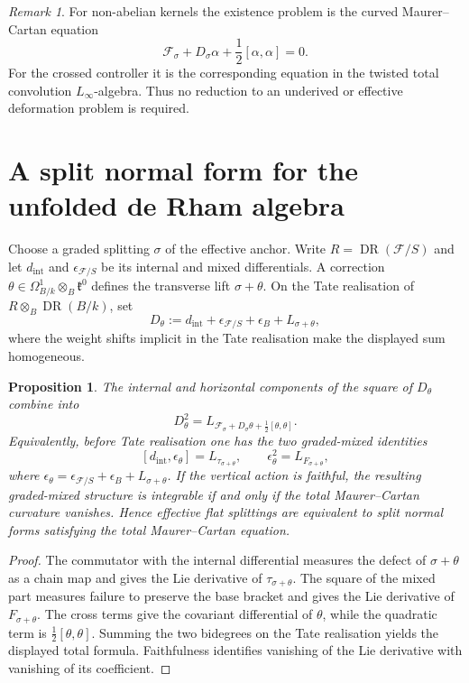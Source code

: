 \documentclass[11pt,reqno,a4paper,dvipsnames,x11names]{amsart}
\numberwithin{equation}{section}
\theoremstyle{plain}
\newtheorem{proposition}[theorem]{Proposition}
\theoremstyle{definition}
\theoremstyle{remark}
\newtheorem{remark}[theorem]{Remark}
\DeclareMathOperator{\DR}{DR}
\newcommand{\kk}{k}
\newcommand{\cF}{\mathcal F}
\newcommand{\kfr}{\mathfrak k}
\begin{document}
\begin{remark}
For non-abelian kernels the existence problem is the curved Maurer--Cartan equation
\[
 \mathcal F_\sigma+D_\sigma\alpha
 +\frac12[\alpha,\alpha]=0.
\]
For the crossed controller it is the corresponding equation in the twisted total convolution \(L_\infty\)-algebra. Thus no reduction to an underived or effective deformation problem is required.
\end{remark}

\section{A split normal form for the unfolded de Rham algebra}\label{sec:normal-form}

Choose a graded splitting \(\sigma\) of the effective anchor. Write
\(R=\DR(\cF/S)\) and let \(d_{\mathrm{int}}\) and \(\epsilon_{\cF/S}\) be its internal and mixed differentials. A correction
\(\theta\in\Omega^1_{B/\kk}\otimes_B\kfr^0\) defines the transverse lift
\(\sigma+\theta\). On the Tate realisation of
\(R\otimes_B\DR(B/\kk)\), set
\[
 D_\theta
 :=d_{\mathrm{int}}
   +\epsilon_{\cF/S}+\epsilon_B
   +L_{\sigma+\theta},
\]
where the weight shifts implicit in the Tate realisation make the displayed sum homogeneous.

\begin{proposition}\label{prop:normal-form}
The internal and horizontal components of the square of \(D_\theta\) combine into
\[
 D_\theta^2
 =L_{\mathcal F_\sigma+D_\sigma\theta+\frac12[\theta,\theta]}.
\]
Equivalently, before Tate realisation one has the two graded-mixed identities
\[
 [d_{\mathrm{int}},\epsilon_\theta]
 =L_{\tau_{\sigma+\theta}},
 \qquad
 \epsilon_\theta^2=L_{F_{\sigma+\theta}},
\]
where
\(\epsilon_\theta=\epsilon_{\cF/S}+\epsilon_B+L_{\sigma+\theta}\).
If the vertical action is faithful, the resulting graded-mixed structure is integrable if and only if the total Maurer--Cartan curvature vanishes. Hence effective flat splittings are equivalent to split normal forms satisfying the total Maurer--Cartan equation.
\end{proposition}

\begin{proof}
The commutator with the internal differential measures the defect of \(\sigma+\theta\) as a chain map and gives the Lie derivative of \(\tau_{\sigma+\theta}\). The square of the mixed part measures failure to preserve the base bracket and gives the Lie derivative of \(F_{\sigma+\theta}\). The cross terms give the covariant differential of \(\theta\), while the quadratic term is \(\frac12[\theta,\theta]\). Summing the two bidegrees on the Tate realisation yields the displayed total formula. Faithfulness identifies vanishing of the Lie derivative with vanishing of its coefficient.
\end{proof}
\end{document}
